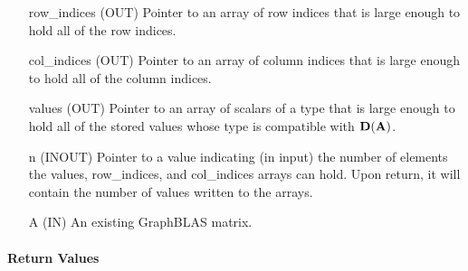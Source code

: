\begin{itemize}[leftmargin=1.1in]
    \item[{\sf row\_indices}] ({\sf OUT}) Pointer to an array of row indices
                        that is large enough to hold all of the row indices.
    \item[{\sf col\_indices}] ({\sf OUT}) Pointer to an array of column indices
                        that is large enough to hold all of the column indices. 
    \item[{\sf values}] ({\sf OUT}) Pointer to an array of scalars of a type
                        that is large enough to hold all of the stored values whose
                        type is compatible with $\mathbf{D}({\bf A})$.
    \item[{\sf n}] ({\sf INOUT}) Pointer to a value indicating (in input) the number of
                        elements the {\sf values}, {\sf row\_indices}, and
                        {\sf col\_indices} arrays can hold. Upon return, it will contain the
                        number of values written to the arrays.
    \item[{\sf A}]      ({\sf IN}) An existing GraphBLAS matrix.
\end{itemize}

\paragraph{Return Values}

